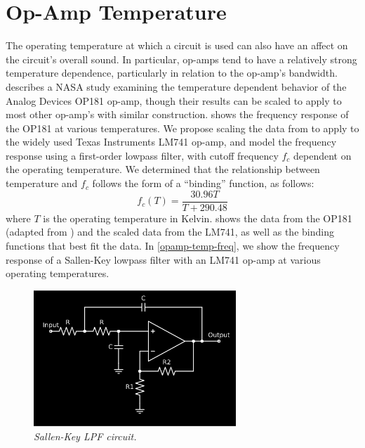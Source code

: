 \documentclass[twoside,a4paper]{article}
\begin{document}
\section{Op-Amp Temperature} \label{sec:temp}
%
The operating temperature at which a circuit is used can also have an
affect on the circuit's overall sound. In particular, op-amps tend to
have a relatively strong temperature dependence, particularly in relation
to the op-amp's bandwidth. \cite{opamp-temp} describes a NASA study
examining the temperature dependent behavior of the Analog Devices OP181
op-amp, though their results can be scaled to apply to most other op-amp's
with similar construction.  shows the frequency response of the
OP181 at various temperatures.
\newline\newline
We propose scaling the data from \cite{opamp-temp} to apply to the widely
used Texas Instruments LM741 op-amp, and model the frequency response
using a first-order lowpass filter, with cutoff frequency $f_c$ dependent
on the operating temperature. We determined that the relationship between
temperature and $f_c$ follows the form of a ``binding'' function, as follows:
%
\begin{equation}
    f_c(T) = \frac{30.96 T}{T + 290.48}  
    \label{eq:binding}
\end{equation}
%
where $T$ is the operating temperature in Kelvin.  shows
the data from the OP181 (adapted from \cite{opamp-temp}) and the scaled
data from the LM741, as well as the binding functions that best fit the
data. In \cref{opamp-temp-freq}, we show the frequency response of a
Sallen-Key lowpass filter with an LM741 op-amp at various operating
temperatures.
%
\begin{figure}[h]
    \center
    \includegraphics[width=3in]{../CMTolerance/Pics/sallen-key.png}
    \caption{\label{sallenkey}{\it Sallen-Key LPF circuit.}}
\end{figure}
%
\end{document}
